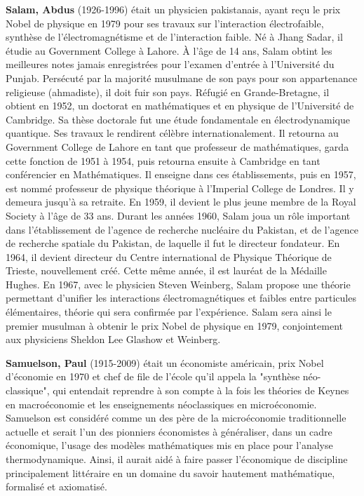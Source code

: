 \textbf{Salam, Abdus} (1926-1996) était un physicien pakistanais, ayant reçu le prix Nobel de physique en 1979 pour ses travaux sur l'interaction électrofaible, synthèse de l'électromagnétisme et de l'interaction faible. Né à Jhang Sadar, il étudie au Government College à Lahore. À l'âge de 14 ans, Salam obtint les meilleures notes jamais enregistrées pour l'examen d'entrée à l'Université du Punjab. Persécuté par la majorité musulmane de son pays pour son appartenance religieuse (ahmadiste), il doit fuir son pays. Réfugié en Grande-Bretagne, il obtient en 1952, un doctorat en mathématiques et en physique de l'Université de Cambridge. Sa thèse doctorale fut une étude fondamentale en électrodynamique quantique. Ses travaux le rendirent célèbre internationalement. Il retourna au Government College de Lahore en tant que professeur de mathématiques, garda cette fonction de 1951 à 1954, puis retourna ensuite à Cambridge en tant conférencier en Mathématiques. Il enseigne dans ces établissements, puis en 1957, est nommé professeur de physique théorique à l'Imperial College de Londres. Il y demeura jusqu'à sa retraite. En 1959, il devient le plus jeune membre de la Royal Society à l'âge de 33 ans. Durant les années 1960, Salam joua un rôle important dans l'établissement de l'agence de recherche nucléaire du Pakistan, et de l'agence de recherche spatiale du Pakistan, de laquelle il fut le directeur fondateur. En 1964, il devient directeur du Centre international de Physique Théorique de Trieste, nouvellement créé. Cette même année, il est lauréat de la Médaille Hughes. En 1967, avec le physicien Steven Weinberg, Salam propose une théorie permettant d'unifier les interactions électromagnétiques et faibles entre particules élémentaires, théorie qui sera confirmée par l'expérience. Salam sera ainsi le premier musulman à obtenir le prix Nobel de physique en 1979, conjointement aux physiciens Sheldon Lee Glashow et Weinberg.

\textbf{Samuelson, Paul} (1915-2009) était un économiste américain, prix Nobel d'économie en 1970 et chef de file de l'école qu'il appela la "synthèse néo-classique", qui entendait reprendre à son compte à la fois les théories de Keynes en macroéconomie et les enseignements néoclassiques en microéconomie. Samuelson est considéré comme un des père de la microéconomie traditionnelle actuelle et serait l'un des pionniers économistes à généraliser, dans un cadre économique, l'usage des modèles mathématiques mis en place pour l'analyse thermodynamique. Ainsi, il aurait aidé à faire passer l'économique de discipline principalement littéraire en un domaine du savoir hautement mathématique, formalisé et axiomatisé.

